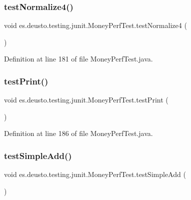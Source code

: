 \subsubsection{\texorpdfstring{testNormalize4()}{testNormalize4()}}
{\footnotesize\ttfamily void es.\+deusto.\+testing.\+junit.\+Money\+Perf\+Test.\+test\+Normalize4 (\begin{DoxyParamCaption}{ }\end{DoxyParamCaption})}



Definition at line 181 of file Money\+Perf\+Test.\+java.

\mbox{\label{classes_1_1deusto_1_1testing_1_1junit_1_1_money_perf_test_a08eef6d228585efc624788e89a0cb9de}} 
\subsubsection{\texorpdfstring{testPrint()}{testPrint()}}
{\footnotesize\ttfamily void es.\+deusto.\+testing.\+junit.\+Money\+Perf\+Test.\+test\+Print (\begin{DoxyParamCaption}{ }\end{DoxyParamCaption})}



Definition at line 186 of file Money\+Perf\+Test.\+java.

\mbox{\label{classes_1_1deusto_1_1testing_1_1junit_1_1_money_perf_test_ad57f17d866d4079fb2cf74d5c1e8e339}} 
\subsubsection{\texorpdfstring{testSimpleAdd()}{testSimpleAdd()}}
{\footnotesize\ttfamily void es.\+deusto.\+testing.\+junit.\+Money\+Perf\+Test.\+test\+Simple\+Add (\begin{DoxyParamCaption}{ }\end{DoxyParamCaption})}



